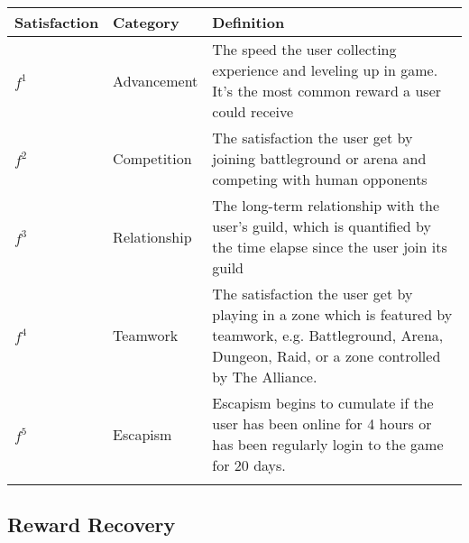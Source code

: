 \documentclass[a4paper]{article}
\begin{document}
\begin{tabular}{l|l|p{7cm}}
    \toprule
    Satisfaction & Category & Definition \\
    \midrule
    $f^1$ & Advancement & The speed the user collecting experience and leveling up in game. It's the most common reward a user could receive \\
    $f^2$ & Competition & The satisfaction the user get by joining battleground or arena and competing with human opponents \\
    $f^3$ & Relationship & The long-term relationship with the user's guild, which is quantified by the time elapse since the user join its guild \\
    $f^4$ & Teamwork & The satisfaction the user get by playing in a zone which is featured by teamwork, e.g. Battleground, Arena, Dungeon, Raid, or a zone controlled by The Alliance. \\
    $f^5$ & Escapism & Escapism begins to cumulate if the user has been online for 4 hours or has been regularly login to the game for 20 days. \\
    \bottomrule
    \label{tbl:rewards}
\end{tabular}

\subsection{Reward Recovery}
\end{document}
